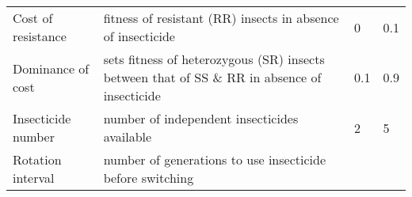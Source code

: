 \documentclass[11pt,]{article}
\begin{document}
\begin{longtable}[]{@{}llll@{}}
\begin{minipage}[t]{0.28\columnwidth}
Cost of resistance\strut
\end{minipage} & \begin{minipage}[t]{0.46\columnwidth}\raggedright\strut
fitness of resistant (RR) insects in absence of insecticide\strut
\end{minipage} & \begin{minipage}[t]{0.07\columnwidth}\raggedright\strut
0\strut
\end{minipage} & \begin{minipage}[t]{0.07\columnwidth}\raggedright\strut
0.1\strut
\end{minipage}\tabularnewline
\begin{minipage}[t]{0.28\columnwidth}\raggedright\strut
Dominance of cost\strut
\end{minipage} & \begin{minipage}[t]{0.46\columnwidth}\raggedright\strut
sets fitness of heterozygous (SR) insects between that of SS \& RR in
absence of insecticide\strut
\end{minipage} & \begin{minipage}[t]{0.07\columnwidth}\raggedright\strut
0.1\strut
\end{minipage} & \begin{minipage}[t]{0.07\columnwidth}\raggedright\strut
0.9\strut
\end{minipage}\tabularnewline
\begin{minipage}[t]{0.28\columnwidth}\raggedright\strut
Insecticide number\strut
\end{minipage} & \begin{minipage}[t]{0.46\columnwidth}\raggedright\strut
number of independent insecticides available\strut
\end{minipage} & \begin{minipage}[t]{0.07\columnwidth}\raggedright\strut
2\strut
\end{minipage} & \begin{minipage}[t]{0.07\columnwidth}\raggedright\strut
5\strut
\end{minipage}\tabularnewline
\begin{minipage}[t]{0.28\columnwidth}\raggedright\strut
Rotation interval\strut
\end{minipage} & \begin{minipage}[t]{0.46\columnwidth}\raggedright\strut
number of generations to use insecticide before switching\strut
\end{minipage} & \begin{minipage}[t]{0.07\columnwidth}\raggedright\strut

\end{minipage}
\end{longtable}
\end{document}
